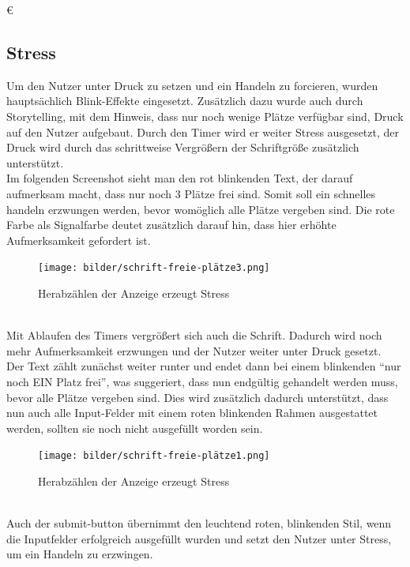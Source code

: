€\documentclass[./dokumentation.tex]{subfiles}
\begin{document}
\subsection{Stress}
Um den Nutzer unter Druck zu setzen und ein Handeln zu forcieren, wurden hauptsächlich Blink-Effekte eingesetzt. Zusätzlich dazu wurde auch durch Storytelling, mit dem Hinweis, dass nur noch wenige Plätze verfügbar sind, Druck auf den Nutzer aufgebaut. Durch den Timer wird er weiter Stress ausgesetzt, der Druck wird durch das schrittweise Vergrößern der Schriftgröße zusätzlich unterstützt.\\
Im folgenden Screenshot sieht man den rot blinkenden Text, der darauf aufmerksam macht, dass nur noch 3 Plätze frei sind. Somit soll ein schnelles handeln erzwungen werden, bevor womöglich alle Plätze vergeben sind. Die rote Farbe als Signalfarbe deutet zusätzlich darauf hin, dass hier erhöhte Aufmerksamkeit gefordert ist.\\


\begin{figure}[H]
    \centering
    \texttt{[image: bilder/schrift-freie-plätze3.png]}
    \caption{Herabzählen der Anzeige erzeugt Stress}
    \label{fig14:platz}
\end{figure}\\


Mit Ablaufen des Timers vergrößert sich auch die Schrift. Dadurch wird noch mehr Aufmerksamkeit erzwungen und der Nutzer weiter unter Druck gesetzt.\\
Der Text zählt zunächst weiter runter und endet dann bei einem blinkenden “nur noch EIN Platz frei”, was suggeriert, dass nun endgültig gehandelt werden muss, bevor alle Plätze vergeben sind. Dies wird zusätzlich dadurch unterstützt, dass nun auch alle Input-Felder mit einem roten blinkenden Rahmen ausgestattet werden, sollten sie noch nicht ausgefüllt worden sein. \\


\begin{figure}[H]
    \centering
    \texttt{[image: bilder/schrift-freie-plätze1.png]}
    \caption{Herabzählen der Anzeige erzeugt Stress}
    \label{fig14:platz1}
\end{figure}\\

Auch der submit-button übernimmt den leuchtend roten, blinkenden Stil, wenn die Inputfelder erfolgreich ausgefüllt wurden und setzt den Nutzer unter Stress, um ein Handeln zu erzwingen.

\end{document}
